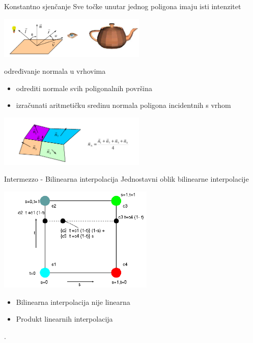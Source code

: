 \documentclass[9pt]{beamer}
\begin{document}
\begin{frame}{Konstantno sjenčanje}      
	Sve točke unutar jednog poligona imaju isti intenzitet 
	\begin{center}
		\includegraphics[width=7cm]{slike/08_flat_shade.png}
	\end{center}
	\begin{block}{određivanje normala u vrhovima}
		\begin{itemize}
			\item odrediti normale svih poligonalnih površina
			\item izračunati aritmetičku sredinu normala poligona incidentnih s vrhom
		\end{itemize}
	\end{block}
	
	\begin{center}
		\includegraphics[width=7cm]{slike/08_flat_shade2.png}
	\end{center}
\end{frame}

\begin{frame}{Intermezzo - Bilinearna interpolacija}
	Jednostavni oblik bilinearne interpolacije
	\begin{center}
		\includegraphics[height=5cm]{slike/interp_quad.png}
	\end{center}
	\begin{itemize}
		\item Bilinearna interpolacija nije linearna
		\item Produkt linearnih interpolacija
	\end{itemize}
	.
\end{frame}
\end{document}
